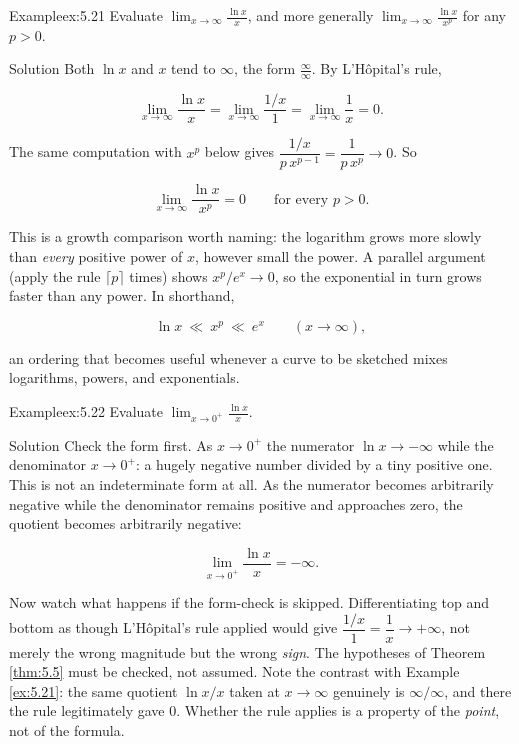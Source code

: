 \documentclass[a4paper,12pt,oneside]{memoir}
\begin{document}
\begin{workedexample}
\begin{envexample}{Example}{ex:5.21}{}
Evaluate \(\displaystyle \lim_{x \to \infty} \frac{\ln x}{x}\), and more generally \(\displaystyle \lim_{x \to \infty} \frac{\ln x}{x^{p}}\) for any \(p > 0\).
\end{envexample}
\begin{envsolution}{Solution}{}{}
Both \(\ln x\) and \(x\) tend to \(\infty\), the form \(\tfrac{\infty}{\infty}\). By L’Hôpital’s rule,

\[ \lim_{x \to \infty} \frac{\ln x}{x} = \lim_{x \to \infty} \frac{1/x}{1} = \lim_{x \to \infty} \frac{1}{x} = 0. \]

The same computation with \(x^{p}\) below gives \(\dfrac{1/x}{p\,x^{p-1}} = \dfrac{1}{p\,x^{p}} \to 0\). So

\[ \lim_{x \to \infty} \frac{\ln x}{x^{p}} = 0 \qquad \text{for every } p > 0. \]

This is a growth comparison worth naming: the logarithm grows more slowly than \emph{every} positive power of \(x\), however small the power. A parallel argument (apply the rule \(\lceil p \rceil\) times) shows \(x^{p}/e^{x} \to 0\), so the exponential in turn grows faster than any power. In shorthand,

\[ \ln x \ \ll\ x^{p} \ \ll\ e^{x} \qquad (x \to \infty), \]

an ordering that becomes useful whenever a curve to be sketched mixes logarithms, powers, and exponentials. \qedmark
\end{envsolution}
\end{workedexample}
\begin{workedexample}
\begin{envexample}{Example}{ex:5.22}{}
Evaluate \(\displaystyle \lim_{x \to 0^{+}} \frac{\ln x}{x}\).
\end{envexample}
\begin{envsolution}{Solution}{}{}
Check the form first. As \(x \to 0^{+}\) the numerator \(\ln x \to -\infty\) while the denominator \(x \to 0^{+}\): a hugely negative number divided by a tiny positive one. This is not an indeterminate form at all. As the numerator becomes arbitrarily negative while the denominator remains positive and approaches zero, the quotient becomes arbitrarily negative:

\[ \lim_{x \to 0^{+}} \frac{\ln x}{x} = -\infty. \]

Now watch what happens if the form-check is skipped. Differentiating top and bottom as though L’Hôpital’s rule applied would give \(\dfrac{1/x}{1} = \dfrac{1}{x} \to +\infty\), not merely the wrong magnitude but the wrong \emph{sign}. The hypotheses of Theorem \ref{thm:5.5} must be checked, not assumed. Note the contrast with Example \ref{ex:5.21}: the same quotient \(\ln x / x\) taken at \(x \to \infty\) genuinely is \(\infty/\infty\), and there the rule legitimately gave \(0\). Whether the rule applies is a property of the \emph{point}, not of the formula. \qedmark
\end{envsolution}
\end{workedexample}
\end{document}

